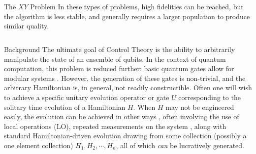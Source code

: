 \documentclass[12pt]{beamer}
\renewcommand{\maketitle}{%
	\begin{center}%
		\Huge\inserttitle\\[5mm]%
		\Large\insertauthor\\[5mm]%
		\Large\insertinstitute%
	\end{center}%
	\vspace*{-1.5ex}%
}
\begin{document}
\begin{frame}{\maketitle}
\begin{columns}
\begin{column}{.45\textwidth}
\begin{block}{The $XY$ Problem}
	In these types of problems, high fidelities can be reached, but the algorithm is less stable, and generally requires a larger population to produce similar quality. 
	\end{block}


%

%

		\end{column}
	
		\end{columns}
	\end{frame}

	\begin{frame}
		\begin{columns}
			\begin{column}{.45\textwidth}
				\begin{exampleblock}{Background}
					The ultimate goal of Control Theory is the ability to arbitrarily manipulate the state of an ensemble of qubits. In the context of quantum computation, this problem is reduced further: basic quantum gates allow for modular systems \cite{bremner}. However, the generation of these gates is non-trivial, and the arbitrary Hamiltonian is, in general, not readily constructible. Often one will wish to achieve a specific unitary evolution operator or gate $U$ corresponding to the solitary time evolution of a Hamiltonian $H$. When $H$ may not be engineered easily, the evolution can be achieved in other ways \cite{bremner} , often involving the use of local operations (LO), repeated measurements on the system \cite{bennett}, along with standard Hamiltonian-driven evolution drawing from some collection (possibly a one element collection) $H_1, H_2, \cdots, H_n$, all of which \emph{can} be lucratively generated.


\end{exampleblock}
\end{column}
\end{columns}
\end{frame}
\end{document}
